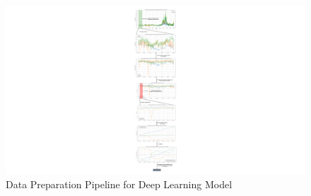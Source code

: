 \documentclass[12pt]{article}
\begin{document}
\begin{figure}[t]
    \centering
    \hspace*{-12.2cm} %
    \includegraphics[width=2.35\textwidth]{figures/input_preparation_pipeline_example.pdf}
    \caption{Data Preparation Pipeline for Deep Learning Model}
    \label{fig:data_preparation_pipeline}
\end{figure}

\clearpage
\end{document}
